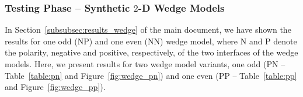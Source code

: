 \documentclass[journal]{IEEEtran}
\begin{document}
\begin{table}[t]
    \centering
    \caption{Metrics averaged over $1000$ test realizations of synthetic $1$-D traces for \textbf{sparsity factor} $\mathbf{0.20}$. {\it Nu}SPAN-$1$ and {\it Nu}SPAN-$2$ outperform the benchmark techniques in both amplitude and support recovery. Here, all the methods are tuned/trained with the same sparsity factor as they are tested for.}
    \label{table:1d_k_0.20}
\end{table}

\subsubsection{Testing Phase -- Synthetic \texorpdfstring{$2$}{2}-D Wedge Models}

In Section~\ref{subsubsec:results_wedge} of the main document, we have shown the results for one odd (NP) and one even (NN) wedge model, where N and P denote the polarity, negative and positive, respectively, of the two interfaces of the wedge models. Here, we present results for two wedge model variants, one odd (PN -- Table~\ref{table:pn} and Figure~\ref{fig:wedge_pn}) and one even (PP -- Table~\ref{table:pp} and Figure~\ref{fig:wedge_pp}).
\end{document}
